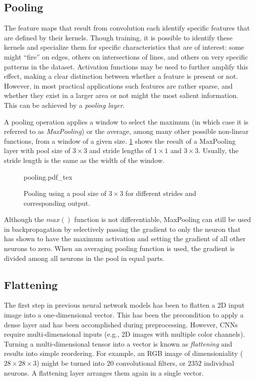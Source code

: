 \subsection{Pooling}

The feature maps that result from convolution each identify specific features that are defined by their kernels.
Though training, it is possible to identify these kernels and specialize them for specific characteristics that are of interest: some might ``fire'' on edges, others on intersections of lines, and others on very specific patterns in the dataset.
Activation functions may be used to further amplify this effect, making a clear distinction between whether a feature is present or not.
However, in most practical applications such features are rather sparse, and whether they exist in a larger area or not might the most salient information. This can be achieved by a \textsl{pooling layer}.

A pooling operation applies a window to select the maximum (in which case it is referred to as \textsl{MaxPooling}) or the average, among many other possible non-linear functions, from a window of a given size. \cref{fig:pooling} shows the result of a MaxPooling layer with pool size of $3\times3$ and stride lengths of $1\times1$ and $3\times3$. Usually, the stride length is the same as the width of the window.

\begin{figure}[htb]
    \centering
    \def\svgwidth{0.8\textwidth}
    {pooling.pdf_tex}
    \caption{Pooling using a pool size of $3\times3$ for different strides and corresponding output.\label{fig:pooling}}
\end{figure}

Although the $max()$ function is not differentiable, MaxPooling can still be used in backpropagation by selectively passing the gradient to only the neuron that has shown to have the maximum activation and setting the gradient of all other neurons to zero. When an averaging pooling function is used, the gradient is divided among all neurons in the pool in equal parts.

\subsection{Flattening}

The first step in previous neural network models has been to flatten a 2D input image into a one-dimensional vector. This has been the precondition to apply a dense layer and has been accomplished during preprocessing.
However, CNNs require multi-dimensional inputs (e.g., 2D images with multiple color channels). Turning a multi-dimensional tensor into a vector is known as \textsl{flattening} and results into simple reordering. For example, an RGB image of dimensioniality ($28\times28\times3$) might be turned into $20$ convolutional filters, or $2352$ individual neurons. A flattening layer arranges them again in a single vector.

